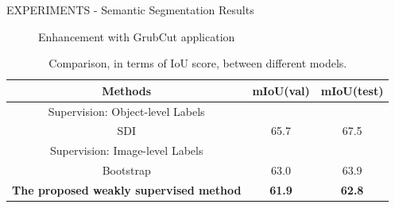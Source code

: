 \begin{frame}{EXPERIMENTS - Semantic Segmentation Results}
\begin{minipage}{\linewidth}
\begin{minipage}{0.45\linewidth}
\begin{figure}[h!]
                \centering
                \caption{Enhancement with GrubCut application}
            \end{figure}
        \end{minipage}
    \end{minipage}
    \begin{table}[h!]
        \centering
        \begin{adjustbox}{max width=0.7\textwidth}
        \begin{tabular}{|c|c|c|}
            \hline
            Methods & mIoU(val) & mIoU(test)\\
            \hline
            Supervision: Object-level Labels & &\\
            SDI \cite{0876055513} & 65.7 & 67.5\\
            \hline
            Supervision: Image-level Labels & &\\
            Bootstrap \cite{0876055555} & 63.0 & 63.9\\
            \bfseries{The proposed weakly supervised method} & \bfseries{61.9} & \bfseries{62.8}\\
            \hline
        \end{tabular}
        \end{adjustbox}
        \caption{Comparison, in terms of IoU score, between different models.}
        \label{IoU score comparison}
    \end{table}
\end{frame}

